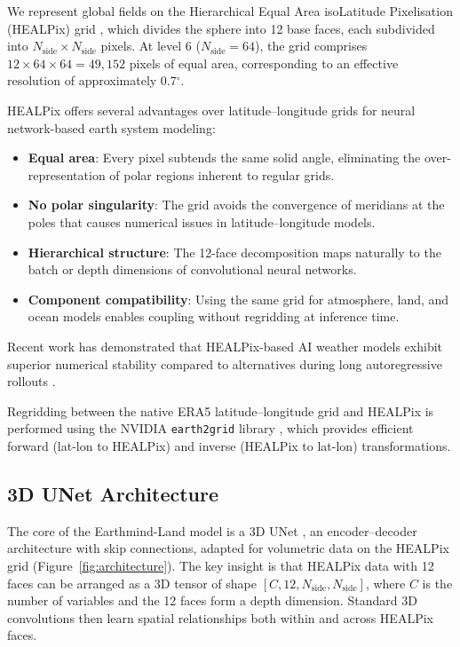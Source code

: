 \documentclass[11pt]{article}
\begin{document}
We represent global fields on the Hierarchical Equal Area isoLatitude Pixelisation (HEALPix) grid \citep{gorski2005healpix}, which divides the sphere into 12 base faces, each subdivided into $N_{\text{side}} \times N_{\text{side}}$ pixels. At level 6 ($N_{\text{side}} = 64$), the grid comprises $12 \times 64 \times 64 = 49{,}152$ pixels of equal area, corresponding to an effective resolution of approximately 0.7$^\circ$.

HEALPix offers several advantages over latitude--longitude grids for neural network-based earth system modeling:
\begin{itemize}
    \item \textbf{Equal area}: Every pixel subtends the same solid angle, eliminating the over-representation of polar regions inherent to regular grids.
    \item \textbf{No polar singularity}: The grid avoids the convergence of meridians at the poles that causes numerical issues in latitude--longitude models.
    \item \textbf{Hierarchical structure}: The 12-face decomposition maps naturally to the batch or depth dimensions of convolutional neural networks.
    \item \textbf{Component compatibility}: Using the same grid for atmosphere, land, and ocean models enables coupling without regridding at inference time.
\end{itemize}

Recent work has demonstrated that HEALPix-based AI weather models exhibit superior numerical stability compared to alternatives during long autoregressive rollouts \citep{karlbauer2024healpix}.

Regridding between the native ERA5 latitude--longitude grid and HEALPix is performed using the NVIDIA \texttt{earth2grid} library \citep{earth2grid2024}, which provides efficient forward (lat-lon to HEALPix) and inverse (HEALPix to lat-lon) transformations.

\subsection{3D UNet Architecture}
\label{sec:architecture}

The core of the Earthmind-Land model is a 3D UNet \citep{ronneberger2015unet}, an encoder--decoder architecture with skip connections, adapted for volumetric data on the HEALPix grid (Figure~\ref{fig:architecture}). The key insight is that HEALPix data with 12 faces can be arranged as a 3D tensor of shape $[C, 12, N_{\text{side}}, N_{\text{side}}]$, where $C$ is the number of variables and the 12 faces form a depth dimension. Standard 3D convolutions then learn spatial relationships both within and across HEALPix faces.
\end{document}
